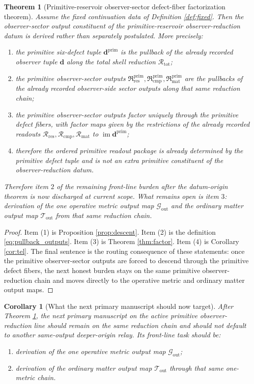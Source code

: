 \documentclass[11pt]{article}
\newcommand{\ReductionTriple}{\mathcal R_{\mathrm{tot}}}
\newcommand{\DefectTuple}{\mathbf d}
\newcommand{\PrimDefectTuple}{\mathbf d^{\mathrm{prim}}}
\newcommand{\PrimResidualSector}{\mathfrak R_{\mathrm{res}}^{\mathrm{prim}}}
\newcommand{\PrimCompletionSector}{\mathfrak R_{\mathrm{cmp}}^{\mathrm{prim}}}
\newcommand{\PrimMatterSector}{\mathfrak R_{\mathrm{mat}}^{\mathrm{prim}}}
\newcommand{\ResidualRead}{\mathscr R_{\mathrm{res}}}
\newcommand{\CompletionRead}{\mathscr R_{\mathrm{cmp}}}
\newcommand{\MatterRead}{\mathscr R_{\mathrm{mat}}}
\newcommand{\MetricOut}{\mathscr G_{\mathrm{out}}}
\newcommand{\MatterOut}{\mathscr T_{\mathrm{out}}}
\newtheorem{corollary}{Corollary}
\newtheorem{theorem}{Theorem}
\begin{document}
\begin{theorem}[Primitive-reservoir observer-sector defect-fiber factorization theorem]
\label{thm:main}
Assume the fixed continuation data of Definition \ref{def:fixed}. Then the observer-sector output constituent of the primitive-reservoir observer-reduction datum is derived rather than separately postulated. More precisely:
\begin{enumerate}
    \item the primitive six-defect tuple \(\PrimDefectTuple\) is the pullback of the already recorded observer tuple \(\DefectTuple\) along the total shell reduction \(\ReductionTriple\);
    \item the primitive observer-sector outputs \(\PrimResidualSector,\PrimCompletionSector,\PrimMatterSector\) are the pullbacks of the already recorded observer-side sector outputs along that same reduction chain;
    \item the primitive observer-sector outputs factor uniquely through the primitive defect fibers, with factor maps given by the restrictions of the already recorded readouts \(\ResidualRead,\CompletionRead,\MatterRead\) to \(\operatorname{im}\PrimDefectTuple\);
    \item therefore the ordered primitive readout package is already determined by the primitive defect tuple and is not an extra primitive constituent of the observer-reduction datum.
\end{enumerate}
Therefore item \(2\) of the remaining front-line burden after the datum-origin theorem is now discharged at current scope. What remains open is item \(3\): derivation of the one operative metric output map \(\MetricOut\) and the ordinary matter output map \(\MatterOut\) from that same reduction chain.
\end{theorem}

\begin{proof}
Item (1) is Proposition \ref{prop:descent}. Item (2) is the definition \eqref{eq:pullback_outputs}. Item (3) is Theorem \ref{thm:factor}. Item (4) is Corollary \ref{cor:tel}. The final sentence is the routing consequence of these statements: once the primitive observer-sector outputs are forced to descend through the primitive defect fibers, the next honest burden stays on the same primitive observer-reduction chain and moves directly to the operative metric and ordinary matter output maps.
\end{proof}

\begin{corollary}[What the next primary manuscript should now target]
\label{cor:next}
After Theorem \ref{thm:main}, the next primary manuscript on the active primitive observer-reduction line should remain on the same reduction chain and should not default to another same-output deeper-origin relay. Its front-line task should be:
\begin{enumerate}
    \item derivation of the one operative metric output map \(\MetricOut\);
    \item derivation of the ordinary matter output map \(\MatterOut\) through that same one-metric chain.
\end{enumerate}
\end{corollary}
\end{document}
